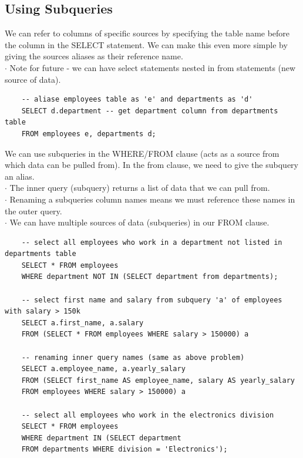 \documentclass[11pt, a4paper]{article}
\begin{document}
\begin{spacing}{1.1}
	\subsection{Using Subqueries}
	We can refer to columns of specific sources by specifying the table name before the column in the SELECT statement. We can make this even more simple by giving the sources aliases as their reference name. \\
	\hspace*{3mm} $\cdot$ Note for future - we can have select statements nested in from statements (new source of data).
	\begin{lstlisting}
	-- aliase employees table as 'e' and departments as 'd'
	SELECT d.department -- get department column from departments table
	FROM employees e, departments d; \end{lstlisting} \vspace*{1mm}
	We can use subqueries in the WHERE/FROM clause (acts as a source from which data can be pulled from). In the from clause, we need to give the subquery an alias. \\
	\hspace*{3mm} $\cdot$ The inner query (subquery) returns a list of data that we can pull from. \\
	\hspace*{3mm} $\cdot$ Renaming a subqueries column names means we must reference these names in the outer query. \\
	\hspace*{3mm} $\cdot$ We can have multiple sources of data (subqueries) in our FROM clause.
	\begin{lstlisting}
	-- select all employees who work in a department not listed in departments table
	SELECT * FROM employees
	WHERE department NOT IN (SELECT department from departments);
	
	-- select first name and salary from subquery 'a' of employees with salary > 150k
	SELECT a.first_name, a.salary 
	FROM (SELECT * FROM employees WHERE salary > 150000) a
	
	-- renaming inner query names (same as above problem)
	SELECT a.employee_name, a.yearly_salary 
	FROM (SELECT first_name AS employee_name, salary AS yearly_salary
	FROM employees WHERE salary > 150000) a 
	
	-- select all employees who work in the electronics division
	SELECT * FROM employees
	WHERE department IN (SELECT department 
	FROM departments WHERE division = 'Electronics');
	

\end{lstlisting}
\end{spacing}
\end{document}
